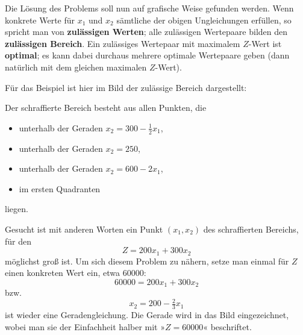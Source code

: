 Die Lösung des Problems soll nun auf grafische Weise gefunden werden. Wenn konkrete Werte für $x_1$ und $x_2$ sämtliche der obigen Ungleichungen erfüllen, so spricht man von \textbf{zulässigen Werten}; alle zulässigen Wertepaare bilden den \textbf{zulässigen Bereich}. Ein zulässiges Wertepaar mit maximalem $Z$-Wert ist \textbf{optimal}; es kann dabei durchaus mehrere optimale Wertepaare geben (dann natürlich mit dem gleichen maximalen $Z$-Wert).

Für das Beispiel ist hier im Bild der zulässige Bereich dargestellt:

\begin{center}
\end{center}

Der schraffierte Bereich besteht aus allen Punkten, die
\begin{itemize}
  \item unterhalb der Geraden $x_2 = 300 - \tfrac{1}{2}x_1$,
  \item unterhalb der Geraden $x_2 = 250$,
  \item unterhalb der Geraden $x_2 = 600 - 2x_1$,
  \item im ersten Quadranten
\end{itemize}
liegen.

Gesucht ist mit anderen Worten ein Punkt $(x_1, x_2)$ des schraffierten Bereichs, für den
\[ Z = 200 x_1 + 300 x_2 \]
möglichst groß ist. Um sich diesem Problem zu nähern, setze man einmal für $Z$ einen konkreten Wert ein, etwa 60000:
\[ 60000 = 200 x_1 + 300 x_2 \]
bzw.
\[ x_2 = 200 - \tfrac{2}{3} x_1 \]
ist wieder eine Geradengleichung. Die Gerade wird in das Bild eingezeichnet, wobei man sie der Einfachheit halber mit »$Z = 60000$« beschriftet.

